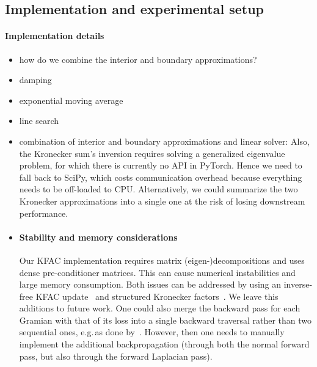 \subsection{Implementation and experimental setup}

\paragraph{Implementation details}
\begin{itemize}
    \item how do we combine the interior and boundary approximations? 
    \item damping
    \item exponential moving average
    \item line search 
    \item combination of interior and boundary approximations and linear solver: Also, the Kronecker sum's inversion requires solving a generalized eigenvalue problem, for which there is currently no API in PyTorch.
    Hence we need to fall back to SciPy, which costs communication overhead because everything needs to be off-loaded to CPU.
    Alternatively, we could summarize the two Kronecker approximations into a single one at the risk of losing downstream performance.
    \item \paragraph{Stability and memory considerations} 
    Our KFAC implementation requires matrix (eigen-)decompositions and uses dense pre-conditioner matrices.
    This can cause numerical instabilities and large memory consumption.
    Both issues can be addressed by using an inverse-free KFAC update~\citep{lin2023simplifying} and structured Kronecker factors~\citep{lin2023structured}.
    We leave this additions to future work.
    One could also merge the backward pass for each Gramian with that of its loss into a single backward traversal rather than two sequential ones, e.g.\,as done by~\cite{dangel2020backpack}.
    However, then one needs to manually implement the additional backpropagation (through both the normal forward pass, but also through the forward Laplacian pass).
\end{itemize}





